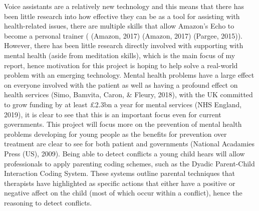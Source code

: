 \documentclass[a4paper,11pt]{report}
\begin{document}
Voice assistants are a relatively new technology and this means that there has been little research into how effective they can be as a tool for assisting with health-related issues, there are multiple skills  that allow Amazon’s Echo to become a personal trainer ( (Amazon, 2017) (Amazon, 2017) (Pargee, 2015)). However, there has been little research directly involved with supporting with mental health (aside from meditation skills), which is the main focus of my report, hence motivation for this project is hoping to help solve a real-world problem with an emerging technology. Mental health problems have a large effect on everyone involved with the patient as well as having a profound effect on health services (Simo, Bamvita, Caron, \& Fleury, 2018), with the UK committed to grow funding by at least £2.3bn a year for mental services (NHS England, 2019), it is clear to see that this is an important focus even for current governments. This project will focus more on the prevention of mental health problems developing for young people as the benefits for prevention over treatment are clear to see for both patient and governments (National Acadamies Press (US), 2009). Being able to detect conflicts a young child hears will allow professionals to apply parenting coding schemes, such as the Dyadic Parent-Child Interaction Coding System. These systems outline parental techniques that therapists have highlighted as specific actions that either have a positive or negative affect on the child (most of which occur within a conflict), hence the reasoning to detect conflicts. \\
 
\end{document}
